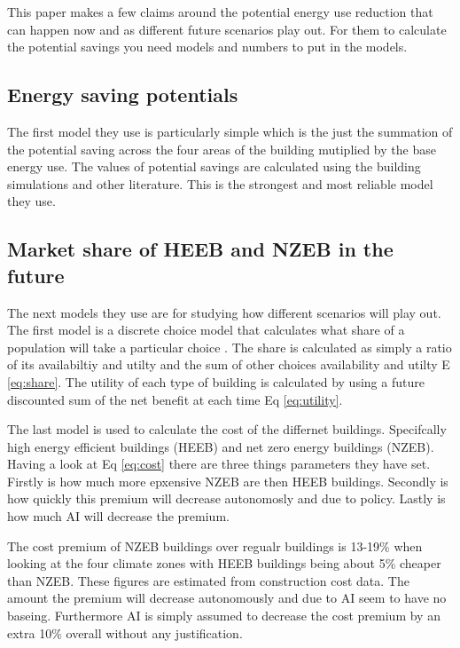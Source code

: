 \documentclass[conference,a4paper]{IEEEtran}
\begin{document}
This paper makes a few claims around the potential energy use reduction that can happen now and as different future scenarios play out. For them to calculate the potential savings you need models and numbers to put in the models.

\subsection*{Energy saving potentials}

The first model they use is particularly simple which is the just the summation of the potential saving across the four areas of the building mutiplied by the base energy use. The values of potential savings are calculated using the building simulations and other literature. This is the strongest and most reliable model they use.

\subsection*{Market share of HEEB and NZEB in the future}

The next models they use are for studying how different scenarios will play out. The first model is a discrete choice model that calculates what share of a population will take a particular choice . The share is calculated as simply a ratio of its availabiltiy and utilty and the sum of other choices availability and utilty E \ref{eq:share}. The utility of each type of building is calculated by using a future discounted sum of the net benefit at each time Eq \ref{eq:utility}.

The last model is used to calculate the cost of the differnet buildings. Specifcally high energy efficient buildings (HEEB) and net zero energy buildings (NZEB). Having a look at Eq \ref{eq:cost} there are three things parameters they have set. Firstly is how much more epxensive NZEB are then HEEB buildings. Secondly is how quickly this premium will decrease autonomosly and due to policy. Lastly is how much AI will decrease the premium.

The cost premium of NZEB buildings over regualr buildings is 13-19\% when looking at the four climate zones with HEEB buildings being about 5\% cheaper than NZEB. These figures are estimated from construction cost data. The amount the premium will decrease autonomously and due to AI seem to have no baseing. Furthermore AI is simply assumed to decrease the cost premium by an extra 10\% overall without any justification.
\end{document}
